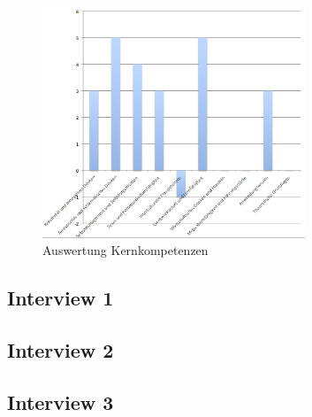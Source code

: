 \begin{figure}[ht]
	\centering
	\includegraphics[width=0.7\textwidth]{images/Auswertung_kernkompetenzen}
	\caption{Auswertung Kernkompetenzen}
	\label{auswkerkomp}
\end{figure}



\subsection{Interview 1}

\subsection{Interview 2}

\subsection{Interview 3}
